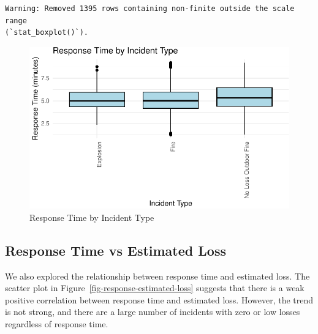 \documentclass[
  letterpaper,
  DIV=11,
  numbers=noendperiod]{scrartcl}
\begin{document}
\begin{verbatim}
Warning: Removed 1395 rows containing non-finite outside the scale range
(`stat_boxplot()`).
\end{verbatim}

\begin{figure}[H]

{\centering \includegraphics{paper_files/figure-pdf/fig-response-incident-type-1.pdf}

}

\caption{\label{fig-response-incident-type}Response Time by Incident
Type}

\end{figure}

\hypertarget{response-time-vs-estimated-loss}{%
\subsection{Response Time vs Estimated
Loss}\label{response-time-vs-estimated-loss}}

We also explored the relationship between response time and estimated
loss. The scatter plot in Figure~\ref{fig-response-estimated-loss}
suggests that there is a weak positive correlation between response time
and estimated loss. However, the trend is not strong, and there are a
large number of incidents with zero or low losses regardless of response
time.
\end{document}
